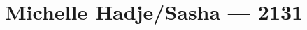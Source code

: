 \hypertarget{michelle-hadjesasha-2131}{%
\chapter{Michelle Hadje/Sasha — 2131}\label{michelle-hadjesasha-2131}}
